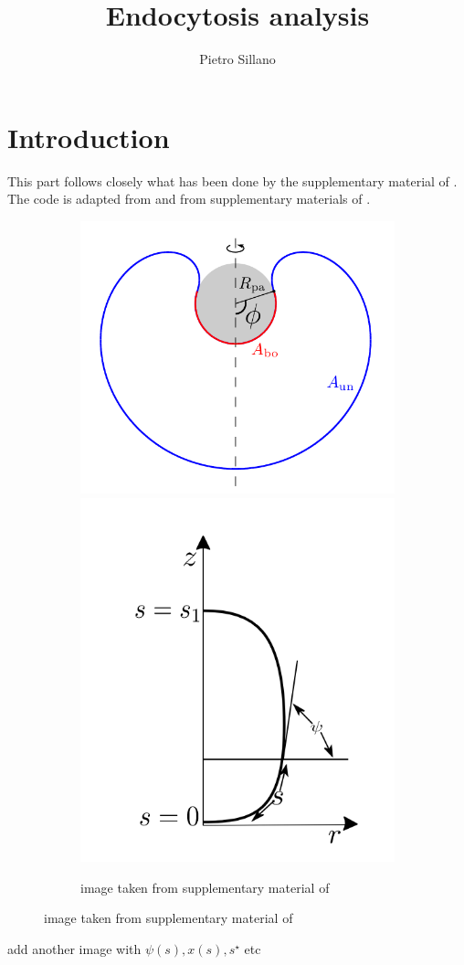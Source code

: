 \documentclass[12pt]{article}
\title{Endocytosis analysis}
\author{Pietro Sillano}
\begin{document}
\maketitle
\tableofcontents

\section{Introduction}
This part follows closely what has been done by the supplementary material of \cite{agudo-canalejoCriticalParticleSizes2015}. 
The code is adapted from \cite{freyMembraneAreaGain2022} and from supplementary materials of \cite{christActiveShapeOscillations2021}.


\begin{figure}[ht]
  \begin{center}
    \begin{subfigure}{0.9\textwidth}
      \includegraphics[width=0.45\linewidth]{img/system.png}
      \includegraphics[width=0.45\linewidth]{img/system2.png}
      \caption{image taken from supplementary material of \cite{agudo-canalejoCriticalParticleSizes2015}}
  \end{subfigure}
  \end{center}
  \label{fig:figure1}
\end{figure}

\alert{add another image with $\psi(s),x(s),s^\star $ etc}
\end{document}
